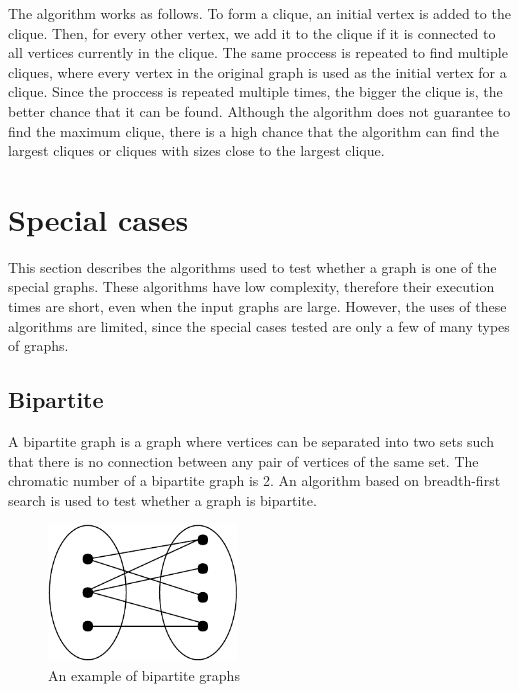 \documentclass[a4paper]{report}
\begin{document}
		The algorithm works as follows. To form a clique, an initial vertex is added to the clique. Then, for every other vertex, we add it to the clique if it is connected to all vertices currently in the clique. The same proccess is repeated to find multiple cliques, where every vertex in the original graph is used as the initial vertex for a clique. Since the proccess is repeated multiple times, the bigger the clique is, the better chance that it can be found. Although the algorithm does not guarantee to find the maximum clique, there is a high chance that the algorithm can find the largest cliques or cliques with sizes close to the largest clique. 

		\section{Special cases}
		This section describes the algorithms used to test whether a graph is one of the special graphs. These algorithms have low complexity, therefore their execution times are short, even when the input graphs are large. However, the uses of these algorithms are limited, since the special cases tested are only a few of many types of graphs.
			\subsection{Bipartite}
			A bipartite graph is a graph where vertices can be separated into two sets such that there is no connection between any pair of vertices of the same set. The chromatic number of a bipartite graph is 2.  An algorithm based on breadth-first search \cite{sedgewick2003}  is used to test whether a graph is bipartite. \\
			
			\begin{figure}[h]
				\centering
				\includegraphics[width=50mm,scale=0.5]{figures/bipartite.pdf}
				\caption{An example of bipartite graphs}
				\label{fig:bipartite}
			\end{figure}
			
\end{document}
